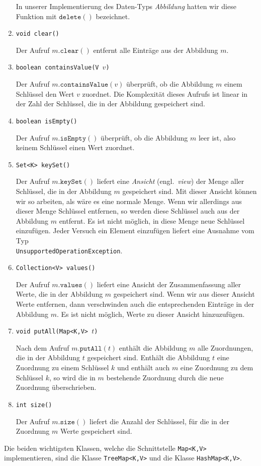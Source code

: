 \begin{enumerate}
      In unserer Implementierung des Daten-Typs \emph{Abbildung} hatten wir diese Funktion
      mit $\texttt{delete}()$ bezeichnet.      
\item \texttt{void clear()}

      Der Aufruf $m.\mathtt{clear}()$ entfernt alle Eintr\"age aus der Abbildung $m$.
\item \texttt{boolean containsValue(V $v$)}

      Der Aufruf $m.\mathtt{containsValue}(v)$ \"uberpr\"uft, ob die Abbildung $m$ einem
      Schl\"ussel den Wert $v$ zuordnet.  Die Komplexit\"at dieses Aufrufs ist linear in der
      Zahl der Schl\"ussel, die in der Abbildung gespeichert sind.
\item \texttt{boolean isEmpty()}
  
      Der Aufruf $m.\mathtt{isEmpty}()$ \"uberpr\"uft, ob die Abbildung $m$ leer ist, also keinem Schl\"ussel
      einen Wert zuordnet.
\item \texttt{Set<K> keySet()}

      Der Aufruf $m.\mathtt{keySet}()$ liefert eine \emph{Ansicht} (engl.~\emph{view}) der
      Menge aller Schl\"ussel, die in der Abbildung $m$ gespeichert sind.
      Mit dieser Ansicht k\"onnen wir so arbeiten, als w\"are es eine normale Menge.  Wenn wir
      allerdings aus dieser Menge Schl\"ussel entfernen, so werden diese Schl\"ussel auch aus
      der Abbildung $m$ entfernt.  Es ist nicht m\"oglich, in diese Menge neue Schl\"ussel
      einzuf\"ugen.  Jeder Versuch ein Element einzuf\"ugen liefert eine Ausnahme vom Typ 
      \\[0.2cm]
      \hspace*{1.3cm} \texttt{UnsupportedOperationException}.       

\item \texttt{Collection<V> values()}

      Der Aufruf $m.\mathtt{values}()$ liefert eine Ansicht der Zusammenfassung aller
      Werte, die in der Abbildung $m$ gespeichert sind.  Wenn wir aus dieser Ansicht Werte
      entfernen, dann verschwinden auch die entsprechenden Eintr\"age in der Abbildung $m$.
      Es ist nicht m\"oglich, Werte zu dieser Ansicht hinzuzuf\"ugen.
\item \texttt{void putAll(Map<K,V> $t$)}

      Nach dem Aufruf $m.\mathtt{putAll}(t)$ enth\"alt die Abbildung $m$ alle Zuordnungen,
      die in der Abbildung $t$ gespeichert sind.  Enth\"alt die Abbildung $t$ eine Zuordnung
      zu einem Schl\"ussel $k$ und enth\"alt auch $m$ eine Zuordnung zu dem Schl\"ussel $k$, so
      wird die in $m$ bestehende Zuordnung durch die neue Zuordnung \"uberschrieben.
\item \texttt{int size()}

      Der Aufruf $m.\mathtt{size}()$ liefert die Anzahl der Schl\"ussel, f\"ur die in der
      Zuordnung $m$ Werte gespeichert sind. 
\end{enumerate}
Die beiden wichtigsten Klassen, welche die Schnittstelle \texttt{Map<K,V>} implementieren, sind
die Klasse \texttt{TreeMap<K,V>} und die Klasse \texttt{HashMap<K,V>}.  

